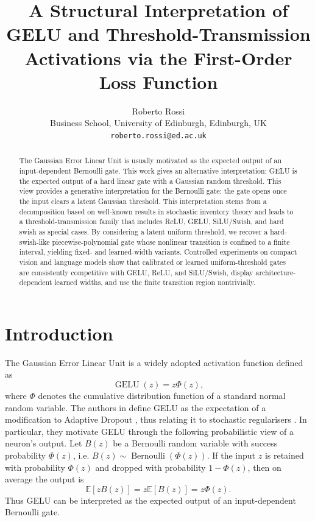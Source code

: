 \documentclass[11pt]{article}
\title{A Structural Interpretation of GELU and Threshold-Transmission Activations via the First-Order Loss Function}
\author{
Roberto Rossi \\
  \small Business School, University of Edinburgh, Edinburgh, UK \\
  \small \texttt{roberto.rossi@ed.ac.uk}
}
\date{}
\begin{document}
\maketitle

\begin{abstract}
The Gaussian Error Linear Unit is usually motivated as the expected output of an input-dependent Bernoulli gate. This work gives an alternative interpretation: GELU is the expected output of a hard linear gate with a Gaussian random threshold. This view provides a generative interpretation for the Bernoulli gate: the gate opens once the input clears a latent Gaussian threshold. This interpretation stems from a decomposition based on well-known results in stochastic inventory theory and leads to a threshold-transmission family that includes ReLU, GELU, SiLU/Swish, and hard swish as special cases. By considering a latent uniform threshold, we recover a hard-swish-like piecewise-polynomial gate whose nonlinear transition is confined to a finite interval, yielding fixed- and learned-width variants. Controlled experiments on compact vision and language models show that calibrated or learned uniform-threshold gates are consistently competitive with GELU, ReLU, and SiLU/Swish, display architecture-dependent learned widths, and use the finite transition region nontrivially.
\end{abstract}


\section{Introduction}

The Gaussian Error Linear Unit \cite{hendrycks2016gelu} is a widely adopted activation function \cite{Dubey2022,kunc2024decadesactivationscomprehensivesurvey} defined as
$$
\operatorname{GELU}(z)=z\Phi(z),
$$
where $ \Phi $ denotes the cumulative distribution function of a standard normal random variable.
The authors in \cite{hendrycks2016gelu} define GELU as the expectation of a modification to Adaptive Dropout \cite{DBLP:conf/nips/BaF13}, thus relating it to stochastic regularisers \cite{JMLR:v15:srivastava14a}.
In particular, they motivate GELU through the following probabilistic view of a neuron's output. 
Let $ B(z) $ be a Bernoulli random variable with success probability $ \Phi(z) $, i.e.
$B(z)\sim \operatorname{Bernoulli}(\Phi(z))$.
If the input $ z $ is retained with probability $ \Phi(z) $ and dropped with probability $ 1-\Phi(z) $, then on average the output is
$$
\mathbb{E}[zB(z)]
=
z\mathbb{E}[B(z)]
=
z\Phi(z).
$$
Thus GELU can be interpreted as the expected output of an input-dependent Bernoulli gate.
\end{document}
